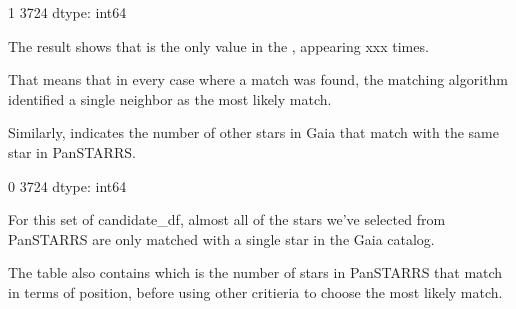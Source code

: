 \documentclass[letterpaper,10pt,english]{sphinxmanual}
\begin{document}
\begin{sphinxVerbatim}[commandchars=\\\{\}]
   

  \PYG{p}{[}\PYG{p}{]}
\end{sphinxVerbatim}

\begin{sphinxVerbatim}[commandchars=\\\{\}]
1    3724
dtype: int64
\end{sphinxVerbatim}

The result shows that  is the only value in the , appearing xxx times.

That means that in every case where a match was found, the matching algorithm identified a single neighbor as the most likely match.

Similarly,  indicates the number of other stars in Gaia that match with the same star in Pan\sphinxhyphen{}STARRS.

\begin{sphinxVerbatim}[commandchars=\\\{\}]
  \PYG{p}{[}\PYG{p}{]}
\end{sphinxVerbatim}

\begin{sphinxVerbatim}[commandchars=\\\{\}]
0    3724
dtype: int64
\end{sphinxVerbatim}

For this set of candidate\_df, almost all of the stars we’ve selected from Pan\sphinxhyphen{}STARRS are only matched with a single star in the Gaia catalog.

 The table also contains  which is the number of stars in Pan\sphinxhyphen{}STARRS that match in terms of position, before using other critieria to choose the most likely match.
\end{document}
